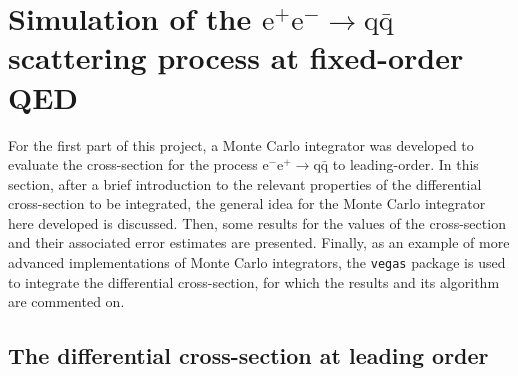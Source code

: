 \section{Simulation of the \texorpdfstring{$\mathrm{e}^{+} \mathrm{e}^{-} \to \mathrm{q} \bar{\mathrm{q}}$}{ee -> qqbar} scattering process at fixed-order QED}

For the first part of this project, a Monte Carlo integrator was developed to evaluate the cross-section for the process $\mathrm{e}^{-} \mathrm{e}^{+} \to \mathrm{q} \bar{\mathrm{q}}$ to leading-order. In this section, after a brief introduction to the relevant properties of the differential cross-section to be integrated, the general idea for the Monte Carlo integrator here developed is discussed. Then, some results for the values of the cross-section and their associated error estimates are presented. Finally, as an example of more advanced implementations of Monte Carlo integrators, the \texttt{vegas} package is used to integrate the differential cross-section, for which the results and its algorithm are commented on.

\subsection{The differential cross-section at leading order}

